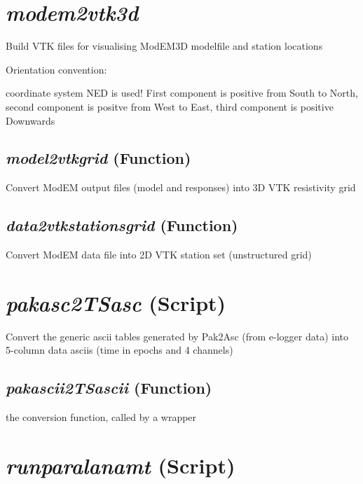 
\section{\textit{modem2vtk3d} }
\label{sec:utils.modem2vtk3d}


Build VTK files for visualising ModEM3D modelfile and station locations

Orientation convention:

coordinate system NED is used! First component is positive from South to North,
 second component is positve from West to East, third component is positive Downwards


\subsection{\textit{model2vtkgrid} (Function)}
\label{ssec:utils.modem2vtk3d.model2vtkgrid}

    Convert ModEM output files (model and responses) into 3D VTK resistivity grid



\subsection{\textit{data2vtkstationsgrid} (Function)}
\label{ssec:utils.modem2vtk3d.data2vtkstationsgrid}


    Convert ModEM data file into 2D VTK station set (unstructured grid)



\section{\textit{pakasc2TSasc} (Script)}
\label{sec:utils.pakasc2TSasc}

Convert the generic ascii tables generated by Pak2Asc (from e-logger data) into 5-column data asciis 
(time in epochs and 4 channels)


\subsection{\textit{pakascii2TSascii} (Function)}
\label{ssec:utils.pakasc2TSasc.pakascii2TSascii}

the conversion function, called by a wrapper


\section{\textit{runparalanamt} (Script) }
\label{sec:utils.runparalanamt}


